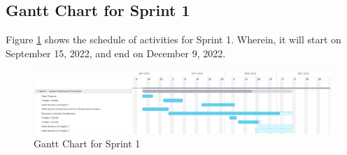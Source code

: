 \subsection{Gantt Chart for Sprint 1}
\label{subsec:gantt_chart_sprint1}
Figure \ref{fig:gantt_chart_sprint1} shows the schedule of activities for Sprint 1. 
Wherein, it will start on September 15, 2022, and end on December 9, 2022.
\begin{figure}[ht]
    \centering
    \includegraphics[width=1\textwidth]{./assets/Chapter_3/Gantt/Gantt_Chart_Sprint1.png}
    \caption{Gantt Chart for Sprint 1}
    \label{fig:gantt_chart_sprint1}
\end{figure}
\FloatBarrier